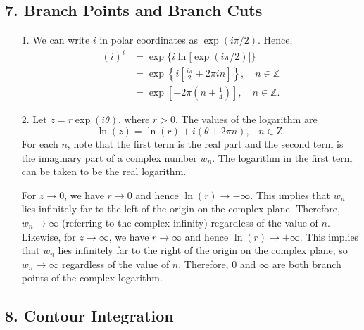 \documentclass[10pt,a4paper]{article}
\begin{document}
\subsection*{7. Branch Points and Branch Cuts}

\begin{enumerate}
\item[1.]
We can write $i$ in polar coordinates as $\exp(i\pi/2).$ Hence,
\begin{align}
  (i)^i &= \exp\Big\{i \ln\big[\exp(i\pi/2)\big]\Big\} \\
  &= \exp\left\{i \left[\frac{i\pi}{2} + 2 \pi i n\right]\right\}, \quad n \in \mathbb{Z} \\
  &= \exp\left[- 2\pi\left(n+\frac{1}{4}\right) \right], \quad n \in \mathbb{Z}.
\end{align}

\item[2.]
Let $z = r\exp(i\theta)$, where $r > 0$. The values of the logarithm
are \begin{equation}
  \ln(z) = \ln(r) + i (\theta + 2\pi n), \;\;\;n \in \mathrm{Z}.
\end{equation}
For each $n$, note that the first term is the real part and the second
term is the imaginary part of a complex number $w_n$. The logarithm in
the first term can be taken to be the real logarithm.

For $z \rightarrow 0$, we have $r \rightarrow 0$ and hence
$\ln(r)\rightarrow -\infty$. This implies that $w_n$ lies infinitely
far to the left of the origin on the complex plane. Therefore, $w_n
\rightarrow \infty$ (referring to the complex infinity) regardless of
the value of $n$. Likewise, for $z \rightarrow \infty$, we have $r
\rightarrow \infty$ and hence $\ln(r)\rightarrow +\infty$. This
implies that $w_n$ lies infinitely far to the right of the origin on
the complex plane, so $w_n \rightarrow \infty$ regardless of the value
of $n$. Therefore, $0$ and $\infty$ are both branch points of the
complex logarithm.
\end{enumerate}

\subsection*{8. Contour Integration}
\end{document}
